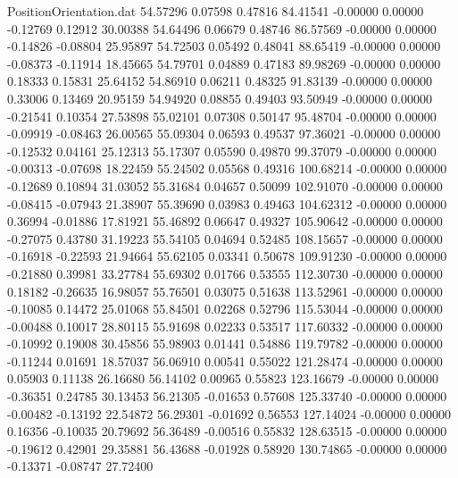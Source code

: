 \begin{filecontents}{PositionOrientation.dat}
  54.57296    0.07598    0.47816    84.41541   -0.00000    0.00000   -0.12769    0.12912   30.00388
  54.64496    0.06679    0.48746    86.57569   -0.00000    0.00000   -0.14826   -0.08804   25.95897
  54.72503    0.05492    0.48041    88.65419   -0.00000    0.00000   -0.08373   -0.11914   18.45665
  54.79701    0.04889    0.47183    89.98269   -0.00000    0.00000    0.18333    0.15831   25.64152
  54.86910    0.06211    0.48325    91.83139   -0.00000    0.00000    0.33006    0.13469   20.95159
  54.94920    0.08855    0.49403    93.50949   -0.00000    0.00000   -0.21541    0.10354   27.53898
  55.02101    0.07308    0.50147    95.48704   -0.00000    0.00000   -0.09919   -0.08463   26.00565
  55.09304    0.06593    0.49537    97.36021   -0.00000    0.00000   -0.12532    0.04161   25.12313
  55.17307    0.05590    0.49870    99.37079   -0.00000    0.00000   -0.00313   -0.07698   18.22459
  55.24502    0.05568    0.49316   100.68214   -0.00000    0.00000   -0.12689    0.10894   31.03052
  55.31684    0.04657    0.50099   102.91070   -0.00000    0.00000   -0.08415   -0.07943   21.38907
  55.39690    0.03983    0.49463   104.62312   -0.00000    0.00000    0.36994   -0.01886   17.81921
  55.46892    0.06647    0.49327   105.90642   -0.00000    0.00000   -0.27075    0.43780   31.19223
  55.54105    0.04694    0.52485   108.15657   -0.00000    0.00000   -0.16918   -0.22593   21.94664
  55.62105    0.03341    0.50678   109.91230   -0.00000    0.00000   -0.21880    0.39981   33.27784
  55.69302    0.01766    0.53555   112.30730   -0.00000    0.00000    0.18182   -0.26635   16.98057
  55.76501    0.03075    0.51638   113.52961   -0.00000    0.00000   -0.10085    0.14472   25.01068
  55.84501    0.02268    0.52796   115.53044   -0.00000    0.00000   -0.00488    0.10017   28.80115
  55.91698    0.02233    0.53517   117.60332   -0.00000    0.00000   -0.10992    0.19008   30.45856
  55.98903    0.01441    0.54886   119.79782   -0.00000    0.00000   -0.11244    0.01691   18.57037
  56.06910    0.00541    0.55022   121.28474   -0.00000    0.00000    0.05903    0.11138   26.16680
  56.14102    0.00965    0.55823   123.16679   -0.00000    0.00000   -0.36351    0.24785   30.13453
  56.21305   -0.01653    0.57608   125.33740   -0.00000    0.00000   -0.00482   -0.13192   22.54872
  56.29301   -0.01692    0.56553   127.14024   -0.00000    0.00000    0.16356   -0.10035   20.79692
  56.36489   -0.00516    0.55832   128.63515   -0.00000    0.00000   -0.19612    0.42901   29.35881
  56.43688   -0.01928    0.58920   130.74865   -0.00000    0.00000   -0.13371   -0.08747   27.72400

\end{filecontents}
